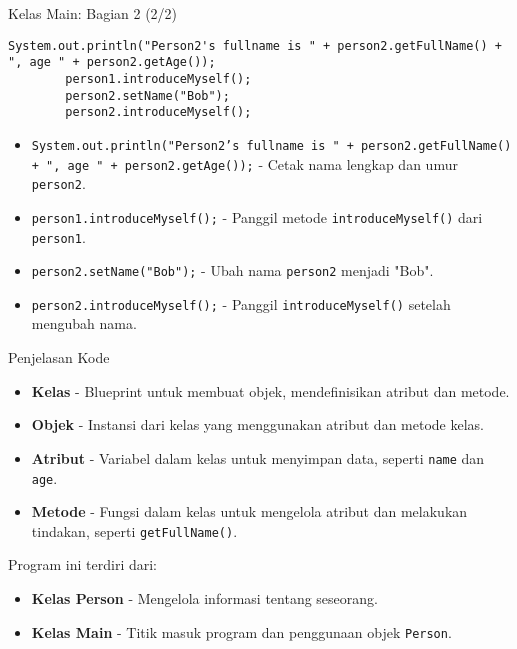 \documentclass[aspectratio=169, table]{beamer}
\begin{document}
\begin{frame}[fragile]{Kelas Main: Bagian 2 (2/2)}
	\begin{lstlisting}[style=JavaStyle]
		System.out.println("Person2's fullname is " + person2.getFullName() + ", age " + person2.getAge());
		person1.introduceMyself();
		person2.setName("Bob");
		person2.introduceMyself();
	\end{lstlisting}
	
	\begin{itemize}
		\item \texttt{System.out.println("Person2's fullname is " + person2.getFullName() + ", age " + person2.getAge());} - Cetak nama lengkap dan umur \texttt{person2}.
		\item \texttt{person1.introduceMyself();} - Panggil metode \texttt{introduceMyself()} dari \texttt{person1}.
		\item \texttt{person2.setName("Bob");} - Ubah nama \texttt{person2} menjadi "Bob".
		\item \texttt{person2.introduceMyself();} - Panggil \texttt{introduceMyself()} setelah mengubah nama.
	\end{itemize}
\end{frame}


\begin{frame}{Penjelasan Kode}
	\begin{itemize}
		\item \textbf{Kelas} - Blueprint untuk membuat objek, mendefinisikan atribut dan metode.
		\item \textbf{Objek} - Instansi dari kelas yang menggunakan atribut dan metode kelas.
		\item \textbf{Atribut} - Variabel dalam kelas untuk menyimpan data, seperti \texttt{name} dan \texttt{age}.
		\item \textbf{Metode} - Fungsi dalam kelas untuk mengelola atribut dan melakukan tindakan, seperti \texttt{getFullName()}.
	\end{itemize}
	Program ini terdiri dari:
	\begin{itemize}
		\item \textbf{Kelas Person} - Mengelola informasi tentang seseorang.
		\item \textbf{Kelas Main} - Titik masuk program dan penggunaan objek \texttt{Person}.
	\end{itemize}
\end{frame}
\end{document}
